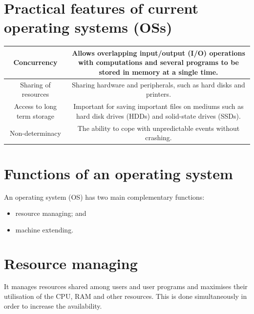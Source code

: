 \documentclass[a4paper]{systems-software}
\begin{document}
\section*{Practical features of current operating systems (OSs)}

\begin{longtable}{|c|c|}
	\hline
	Concurrency &
	\begin{minipage}[t]{0.6\textwidth}
	Allows overlapping input/output (I/O) operations with computations and several programs to be stored in memory at a single time.
	\end{minipage}
	\\ \hline
	Sharing of resources &
	\begin{minipage}[t]{0.6\textwidth}
	Sharing hardware and peripherals, such as hard disks and printers.
	\end{minipage}
	\\ \hline
	Access to long term storage &
	\begin{minipage}[t]{0.6\textwidth}
	Important for saving important files on mediums such as hard disk drives (HDDs) and solid-state drives (SSDs).
	\end{minipage}
	\\ \hline
	Non-determinacy &
	\begin{minipage}[t]{0.6\textwidth}
	The ability to cope with unpredictable events without crashing.
	\end{minipage}
	\\ \hline
\end{longtable}


\section{Functions of an operating system}

An operating system (OS) has two main complementary functions:
\begin{itemize}
	\item resource managing; and
	\item machine extending.
\end{itemize}


\section*{Resource managing}

It manages resources shared among users and user programs and maximises their utilisation of the CPU, RAM and other resources. This is done simultaneously in order to increase the availability.
\end{document}
